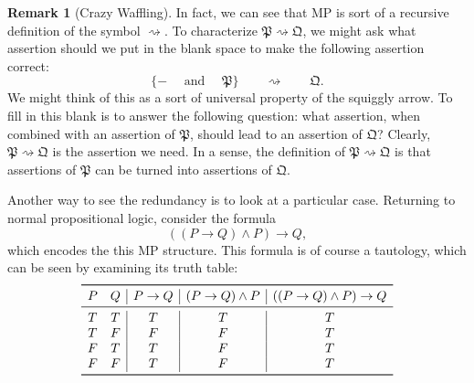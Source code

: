 \documentclass[12pt]{article}
\theoremstyle{definition}
\newtheorem{remark}[theorem]{Remark}
\newcommand{\<}{\langle}
\renewcommand{\>}{\rangle}
\begin{document}
\begin{remark}[Crazy Waffling]
    In fact, we can see that MP is sort of a recursive definition of the symbol $\rightsquigarrow$.
    To characterize $\mathfrak{P} \rightsquigarrow \mathfrak{Q}$, we might ask what assertion should we put in the blank space to make the following assertion correct:
    \[
        \{- \quad\text{ and }\quad \mathfrak{P}\} \qquad\rightsquigarrow\qquad \mathfrak{Q}.
    \]
    We might think of this as a sort of universal property of the squiggly arrow.
    To fill in this blank is to answer the following question: what assertion, when combined with an assertion of $\mathfrak{P}$, should lead to an assertion of $\mathfrak{Q}$?
    Clearly, $\mathfrak{P} \rightsquigarrow \mathfrak{Q}$ is the assertion we need.
    In a sense, the definition of $\mathfrak{P} \rightsquigarrow \mathfrak{Q}$ is that assertions of $\mathfrak{P}$ can be turned into assertions of $\mathfrak{Q}$.
    
    Another way to see the redundancy is to look at a particular case.
    Returning to normal propositional logic, consider the formula
    \[
        ((P \to Q) \land P) \to Q,
    \]
    which encodes the this MP structure.
    This formula is of course a tautology, which can be seen by examining its truth table:
    \[
        \begin{array}{cc|c|c|c}
            \toprule
            P & Q & P \to Q & (P \to Q) \land P & ((P \to Q) \land P) \to Q \\
            \midrule
            T & T & T & T & T \\
            T & F & F & F & T \\
            F & T & T & F & T \\
            F & F & T & F & T \\
            \bottomrule
        \end{array}
    \]
\end{remark}
\end{document}
